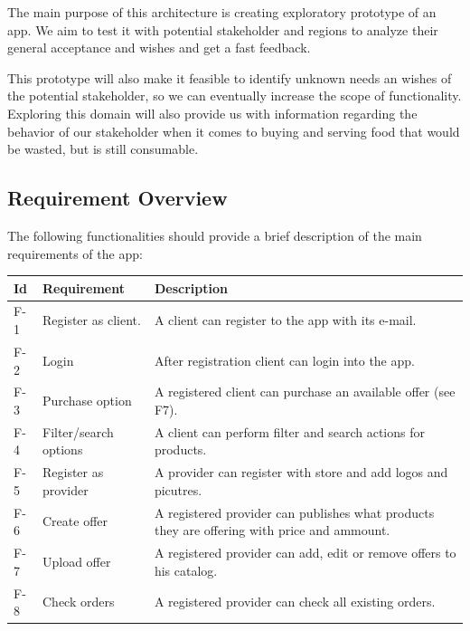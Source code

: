 The main purpose of this architecture is creating exploratory prototype of an \gls{app}. We aim to test it with potential 
\gls{stakeholder} and regions to analyze their general acceptance and wishes \cite{refbook:DSHC} and get a fast feedback. 

This prototype will also make it feasible to identify unknown needs an wishes of the potential \gls{stakeholder}, so we 
can eventually increase the scope of functionality. Exploring this domain will also provide us with information regarding 
the behavior of our \gls{stakeholder} when it comes to buying and serving food that would be wasted, but is still consumable.

\subsection{Requirement Overview} \label{Requirement_Overview}

The following functionalities should provide a brief description of the main requirements of the app:

\begin{table}[H]
    \begin{tabularx}{\textwidth}{llX}
    \toprule
    Id & Requirement & Description  \\
    \midrule
    F-1 & Register as \gls{client}. & A \gls{client} can register to the app with its e-mail.\\
    F-2 & Login & After registration \gls{client} can login into the app. \\
    F-3 & Purchase option & A registered \gls{client} can purchase an available offer (see F7).\\
    F-4 & Filter/search options & A \gls{client} can perform filter and search actions for products.\\
    F-5 & Register as \gls{provider} & A \gls{provider} can register with store and add logos and picutres.\\
    F-6 & Create offer & A registered \gls{provider} can publishes what products they are offering with price 
    and ammount. \\
    F-7 & Upload offer & A registered \gls{provider} can add, edit or remove offers to his catalog.\\
    F-8 & Check orders & A registered \gls{provider} can check all existing orders.\\
    \bottomrule
    \end{tabularx}
\end{table}

